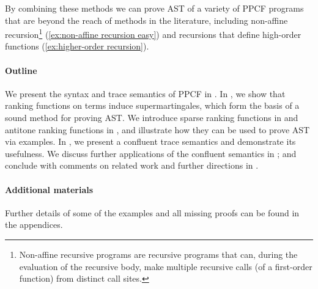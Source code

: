 By combining these methods we can prove AST of a variety of PPCF programs that are beyond the reach of methods in the literature, including non-affine recursion\footnote{\label{fnote:non-affine} Non-affine recursive programs are recursive programs that can, during the evaluation of the recursive body, make multiple recursive calls (of a first-order function) from distinct call sites.} (\cref{ex:non-affine recursion easy}) and recursions that define high-order functions (\cref{ex:higher-order recursion}).

\paragraph*{Outline}

We present the syntax and trace semantics of PPCF in .
In , we show that ranking functions on terms induce supermartingales, which form the basis of a sound method for proving AST.
We introduce sparse ranking functions in  and antitone ranking functions in , and illustrate how they can be used to prove AST via examples. 
In , we present a confluent trace semantics and demonstrate its usefulness.
We discuss further applications of the confluent semantics in ; and conclude with comments on related work and further directions in .

\paragraph*{Additional materials} Further details of some of the examples and all missing proofs can be found in the appendices.
